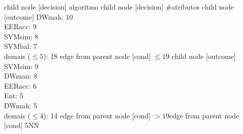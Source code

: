 child {node [decision] {algoritmo}
child {node [decision] {\#atributos}
child {node [outcome] {
DWmah: 10\\
EERacc: 9\\
SVMsim: 8\\
SVMbal: 7\\
demais ($\leq 5$): 18} edge from parent node [cond] {$\leq19$}}
child {node [outcome] {
SVMsim: 9\\
DWman: 8\\
EERacc: 6\\
Ent: 5\\
DWmah: 5\\
demais ($\leq 4$): 14} edge from parent node [cond] {$>19$}}edge from parent node [cond] {5NN}}
}
